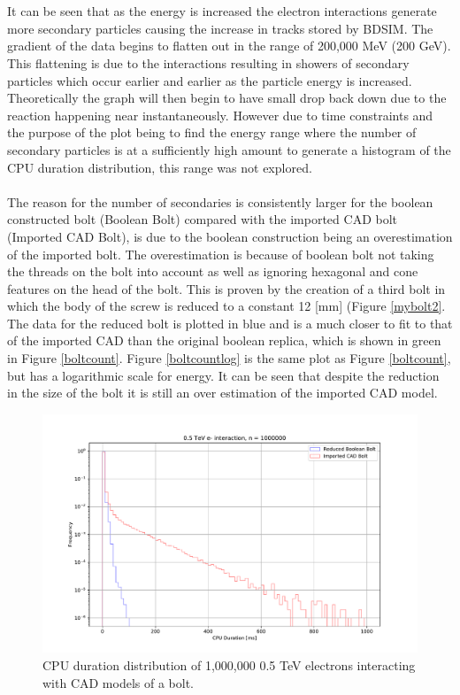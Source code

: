 \documentclass[12pt,a4paper]{article}
\begin{document}
\\\\
\noindent It can be seen that as the energy is increased the electron interactions generate more secondary particles causing the increase in tracks stored by BDSIM. The gradient of the data begins to flatten out in the range of 200,000 MeV (200 GeV). This flattening is due to the interactions resulting in showers of secondary particles which occur earlier and earlier as the particle energy is increased. Theoretically the graph will then begin to have small drop back down due to the reaction happening near instantaneously. However due to time constraints and the purpose of the plot being to find the energy range where the number of secondary particles is at a sufficiently high amount to generate a histogram of the CPU duration distribution, this range was not explored.
\\\\
\noindent The reason for the number of secondaries is consistently larger for the boolean constructed bolt (Boolean Bolt) compared with the imported CAD bolt (Imported CAD Bolt), is due to the boolean construction being an overestimation of the imported bolt. The overestimation is because of boolean bolt not taking the threads on the bolt into account as well as ignoring hexagonal and cone features on the head of the bolt. This is proven by the creation of a third bolt in which the body of the screw is reduced to a constant 12 [mm] (Figure \ref{mybolt2}. The data for the reduced bolt is plotted in blue and is a much closer to fit to that of the imported CAD than the original boolean replica, which is shown in green in Figure \ref{boltcount}. Figure \ref{boltcountlog} is the same plot as Figure \ref{boltcount}, but has a logarithmic scale for energy. It can be seen that despite the reduction in the size of the bolt it is still an over estimation of the imported CAD model. 
\\
\begin{figure}[h!]
\centering
\includegraphics[scale=0.5]{Images//CAD_Screw//boltdist.pdf}
\caption[width=\columnwidth]{CPU duration distribution of 1,000,000 0.5 TeV electrons interacting with CAD models of a bolt.}
\label{lastplot}
\end{figure}
\end{document}
